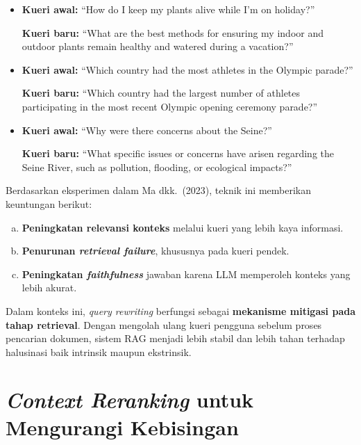 \begin{itemize}
  \item \textbf{Kueri awal:} ``How do I keep my plants alive while I'm on holiday?''

        \textbf{Kueri baru:} ``What are the best methods for ensuring my indoor and outdoor plants remain healthy and watered during a vacation?''

  \item \textbf{Kueri awal:} ``Which country had the most athletes in the Olympic parade?''

        \textbf{Kueri baru:} ``Which country had the largest number of athletes participating in the most recent Olympic opening ceremony parade?''

  \item \textbf{Kueri awal:} ``Why were there concerns about the Seine?''

        \textbf{Kueri baru:} ``What specific issues or concerns have arisen regarding the Seine River, such as pollution, flooding, or ecological impacts?''
\end{itemize}

Berdasarkan eksperimen dalam Ma dkk.\ (2023), teknik ini memberikan keuntungan berikut:
\begin{enumerate}[a.]
  \item \textbf{Peningkatan relevansi konteks} melalui kueri yang lebih kaya informasi.
  \item \textbf{Penurunan \textit{retrieval failure}}, khususnya pada kueri pendek.
  \item \textbf{Peningkatan \textit{faithfulness}} jawaban karena LLM memperoleh konteks yang lebih akurat.
\end{enumerate}

Dalam konteks ini, \textit{query rewriting} berfungsi sebagai \textbf{mekanisme mitigasi pada tahap retrieval}. Dengan mengolah ulang kueri pengguna sebelum proses pencarian dokumen, sistem RAG menjadi lebih stabil dan lebih tahan terhadap halusinasi baik intrinsik maupun ekstrinsik.




\section{\textit{Context Reranking} untuk Mengurangi Kebisingan}
\label{sec:context-reranking}

